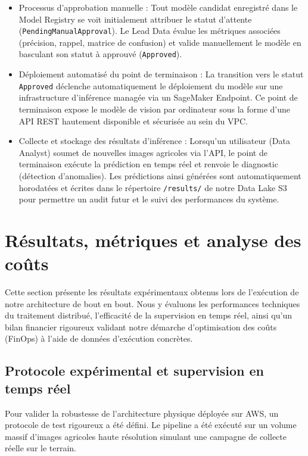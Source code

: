 \begin{itemize}
    \item[$\bullet$] Processus d'approbation manuelle : Tout modèle candidat enregistré dans le Model Registry se voit initialement attribuer le statut d'attente (\texttt{PendingManualApproval}). Le Lead Data évalue les métriques associées (précision, rappel, matrice de confusion) et valide manuellement le modèle en basculant son statut à approuvé (\texttt{Approved}).
    \item[$\bullet$] Déploiement automatisé du point de terminaison : La transition vers le statut \texttt{Approved} déclenche automatiquement le déploiement du modèle sur une infrastructure d'inférence managée via un SageMaker Endpoint. Ce point de terminaison expose le modèle de vision par ordinateur sous la forme d'une API REST hautement disponible et sécurisée au sein du VPC.
    \item[$\bullet$] Collecte et stockage des résultats d'inférence : Lorsqu'un utilisateur (Data Analyst) soumet de nouvelles images agricoles via l'API, le point de terminaison exécute la prédiction en temps réel et renvoie le diagnostic (détection d'anomalies). Les prédictions ainsi générées sont automatiquement horodatées et écrites dans le répertoire \texttt{/results/} de notre Data Lake S3 pour permettre un audit futur et le suivi des performances du système.
\end{itemize}



\section{Résultats, métriques et analyse des coûts}
\label{sec:resultats_metriques_couts}

Cette section présente les résultats expérimentaux obtenus lors de l'exécution de notre architecture de bout en bout. Nous y évaluons les performances techniques du traitement distribué, l'efficacité de la supervision en temps réel, ainsi qu'un bilan financier rigoureux validant notre démarche d'optimisation des coûts (FinOps) à l'aide de données d'exécution concrètes.

\subsection{Protocole expérimental et supervision en temps réel}
Pour valider la robustesse de l'architecture physique déployée sur AWS, un protocole de test rigoureux a été défini. Le pipeline a été exécuté sur un volume massif d'images agricoles haute résolution simulant une campagne de collecte réelle sur le terrain.

